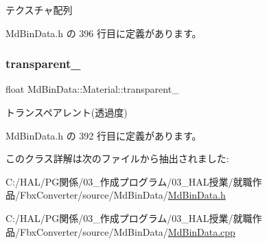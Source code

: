 テクスチャ配列 



 Md\+Bin\+Data.\+h の 396 行目に定義があります。

\mbox{\label{class_md_bin_data_1_1_material_a1d6d026a2e515d99c43bce457a99fb58}} 
\subsubsection{\texorpdfstring{transparent\+\_\+}{transparent\_}}
{\footnotesize\ttfamily float Md\+Bin\+Data\+::\+Material\+::transparent\+\_\+\hspace{0.3cm}{\ttfamily [private]}}



トランスペアレント(透過度) 



 Md\+Bin\+Data.\+h の 392 行目に定義があります。



このクラス詳解は次のファイルから抽出されました\+:\begin{DoxyCompactItemize}
\item 
C\+:/\+H\+A\+L/\+P\+G関係/03\+\_\+作成プログラム/03\+\_\+\+H\+A\+L授業/就職作品/\+Fbx\+Converter/source/\+Md\+Bin\+Data/\mbox{\hyperlink{_md_bin_data_8h}{Md\+Bin\+Data.\+h}}\item 
C\+:/\+H\+A\+L/\+P\+G関係/03\+\_\+作成プログラム/03\+\_\+\+H\+A\+L授業/就職作品/\+Fbx\+Converter/source/\+Md\+Bin\+Data/\mbox{\hyperlink{_md_bin_data_8cpp}{Md\+Bin\+Data.\+cpp}}\end{DoxyCompactItemize}
